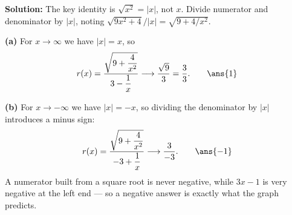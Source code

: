 \documentclass[12pt]{article}
\begin{document}

\textbf{Solution:} The key identity is $\sqrt{x^2} = |x|$, not $x$. Divide
numerator and denominator by $|x|$, noting $\sqrt{9x^2+4}/|x| = \sqrt{9 + 4/x^2}$.

\textbf{(a)} For $x \to \infty$ we have $|x| = x$, so
\[
  r(x) = \frac{\sqrt{9 + \dfrac{4}{x^2}}}{3 - \dfrac{1}{x}}
  \longrightarrow \frac{\sqrt{9}}{3} = \frac{3}{3}. \qquad \ans{1}
\]

\textbf{(b)} For $x \to -\infty$ we have $|x| = -x$, so dividing the denominator
by $|x|$ introduces a minus sign:
\[
  r(x) = \frac{\sqrt{9 + \dfrac{4}{x^2}}}{-3 + \dfrac{1}{x}}
  \longrightarrow \frac{3}{-3}. \qquad \ans{-1}
\]
A numerator built from a square root is never negative, while $3x-1$ is very
negative at the left end --- so a negative answer is exactly what the graph
predicts.
\end{document}
